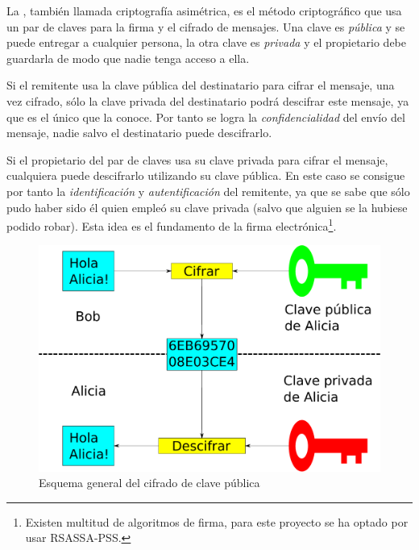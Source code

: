  La , también llamada criptografía asimétrica, es el método criptográfico que usa un par de claves para la firma y el cifrado de mensajes.
 Una clave es \emph{pública} y se puede entregar a cualquier persona, la otra clave es \emph{privada} y el propietario debe guardarla de modo que nadie tenga acceso a ella.

 Si el remitente usa la clave pública del destinatario para cifrar el mensaje, una vez cifrado, sólo la clave privada del destinatario podrá descifrar este mensaje, ya que es el único que la conoce.
 Por tanto se logra la \emph{confidencialidad} del envío del mensaje, nadie salvo el destinatario puede descifrarlo.

 Si el propietario del par de claves usa su clave privada para cifrar el mensaje, cualquiera puede descifrarlo utilizando su clave pública.
 En este caso se consigue por tanto la \emph{identificación} y \emph{autentificación} del remitente, ya que se sabe que sólo pudo haber sido él quien empleó su clave privada (salvo que alguien se la hubiese podido robar).
 Esta idea es el fundamento de la firma electrónica\footnote{Existen multitud de algoritmos de firma, para este proyecto se ha optado por usar RSASSA-PSS.}. \emph{\parencite{Reference5}}

 \begin{figure}[ht]
   \centering
   \includegraphics[scale=0.5]{Figures/PublicKeyEncryption}
   \decoRule
   \caption[Cifrado de clave pública (Esquema)]{Esquema general del cifrado de clave pública}
   \label{fig:PublicKeyEncryption}
 \end{figure}


